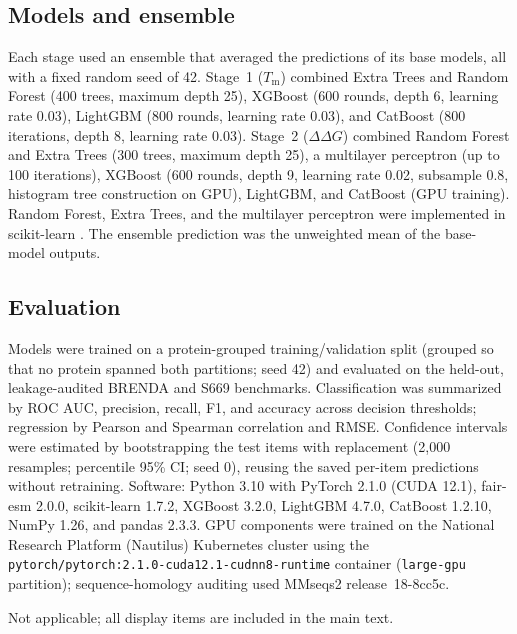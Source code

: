 \documentclass[sn-nature]{sn-jnl}%
\newcommand{\ddg}{\ensuremath{\Delta\Delta G}}
\newcommand{\Tm}{\ensuremath{T_\mathrm{m}}}
\begin{document}
\subsection{Models and ensemble}
Each stage used an ensemble that averaged the predictions of its base models, all with a
fixed random seed of 42. Stage~1 (\Tm) combined Extra Trees and Random Forest (400 trees,
maximum depth 25), XGBoost \cite{chen2016xgboost} (600 rounds, depth 6, learning rate 0.03),
LightGBM \cite{ke2017lightgbm} (800 rounds, learning rate 0.03), and CatBoost
\cite{prokhorenkova2018catboost} (800 iterations, depth 8, learning rate 0.03). Stage~2 (\ddg)
combined Random Forest and Extra Trees (300 trees, maximum depth 25), a multilayer perceptron
(up to 100 iterations), XGBoost (600 rounds, depth 9, learning rate 0.02, subsample 0.8,
histogram tree construction on GPU), LightGBM, and CatBoost (GPU training). Random Forest,
Extra Trees, and the multilayer perceptron were implemented in scikit-learn
\cite{pedregosa2011sklearn}. The ensemble prediction was the unweighted mean of the
base-model outputs.

\subsection{Evaluation}
Models were trained on a protein-grouped training/validation split (grouped so that no
protein spanned both partitions; seed 42) and evaluated on the held-out, leakage-audited
BRENDA and S669 benchmarks. Classification was summarized by ROC AUC, precision, recall, F1,
and accuracy across decision thresholds; regression by Pearson and Spearman correlation and
RMSE. Confidence intervals were estimated by bootstrapping the test items with replacement
(2{,}000 resamples; percentile 95\% CI; seed 0), reusing the saved per-item predictions
without retraining. Software: Python 3.10 with PyTorch 2.1.0 (CUDA 12.1), fair-esm 2.0.0,
scikit-learn 1.7.2, XGBoost 3.2.0, LightGBM 4.7.0, CatBoost 1.2.10, NumPy 1.26, and pandas
2.3.3. GPU components were trained on the National Research Platform (Nautilus) Kubernetes
cluster using the \texttt{pytorch/pytorch:2.1.0-cuda12.1-cudnn8-runtime} container
(\texttt{large-gpu} partition); sequence-homology auditing used MMseqs2 release~18-8cc5c.

\backmatter

Not applicable; all display items are included in the main text.
\end{document}

